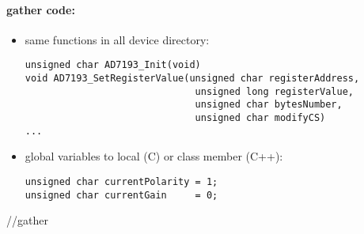 \documentclass[10pt,a4paper]{report}
\begin{document}
\paragraph*{gather code:}
\begin{itemize}
\item same functions in all device directory:
\begin{lstlisting}
unsigned char AD7193_Init(void)
void AD7193_SetRegisterValue(unsigned char registerAddress,
                              unsigned long registerValue,
                              unsigned char bytesNumber,
                              unsigned char modifyCS)
...
\end{lstlisting}

\item global variables to local (C) or class member (C++):
\begin{lstlisting}
unsigned char currentPolarity = 1;
unsigned char currentGain     = 0;
\end{lstlisting}

\end{itemize}//gather
\end{document}
